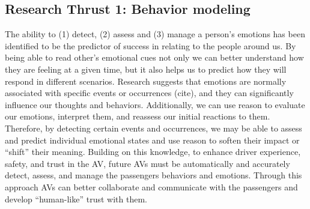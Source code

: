 \subsection{Research Thrust 1: Behavior modeling}
\label{sec:behaviour}

 The ability to (1) detect, (2) assess and (3) manage a person’s emotions has been identified to be the predictor of success in relating to the people around us. 
 By being able to read other’s emotional cues not only we can better understand how they are feeling at a given time, but it also helps us to predict how they will respond in different scenarios. 
 Research suggests that emotions are normally associated with specific events or occurrences (cite), and they can significantly influence our thoughts and behaviors. 
 Additionally, we can use reason to evaluate our emotions, interpret them, and reassess our initial reactions to them. 
 Therefore, by detecting certain events and occurrences, we may be able to assess and predict individual emotional states and use reason to soften their impact or ``shift'' their meaning. 
 Building on this knowledge, to enhance driver experience, safety, and trust in the AV, future AVs must be automatically and accurately detect, assess, and manage the passengers behaviors and emotions. Through this approach AVs can better collaborate and communicate with the passengers and develop “human-like” trust with them. 
 
